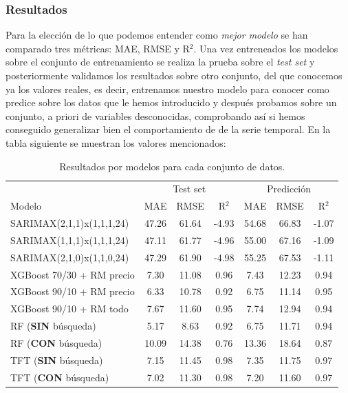 \subsubsection{Resultados}
%
%
%
Para la elección de lo que podemos entender como \textit{mejor modelo} se han comparado tres métricas: MAE, RMSE y R$^2$. Una vez entreneados los modelos sobre el conjunto de entrenamiento se realiza la prueba sobre el \textit{test set} y posteriormente validamos los resultados sobre otro conjunto, del que conocemos ya los valores reales, es decir, entrenamos nuestro modelo para conocer como predice sobre los datos que le hemos introducido y después probamos sobre un conjunto, a priori de variables desconocidas, comprobando así si hemos conseguido generalizar bien el comportamiento de de la serie temporal. En la tabla siguiente se muestran los valores mencionados:
\begin{table}[H]
    \centering
    \begin{tabular}{l|ccc|ccc}
        & \multicolumn{3}{c}{Test set} & \multicolumn{3}{c}{Predicción} \\
        Modelo & MAE & RMSE & R$^2$ & MAE & RMSE & R$^2$ \\
        \hline
        SARIMAX(2,1,1)x(1,1,1,24) & 47.26 & 61.64 & -4.93 & 54.68 & 66.83 & -1.07 \\
        SARIMAX(1,1,1)x(1,1,1,24) & 47.11 & 61.77 & -4.96 & 55.00 & 67.16 & -1.09 \\
        SARIMAX(2,1,0)x(1,1,0,24) & 47.29 & 61.90 & -4.98 & 55.25 & 67.53 & -1.11 \\
        XGBoost 70/30 + RM precio  & 7.30  & 11.08 & 0.96 & 7.43  & 12.23 & 0.94 \\
        XGBoost 90/10 + RM precio  & 6.33  & 10.78 & 0.92 & 6.75  & 11.14 & 0.95 \\
        XGBoost 90/10 + RM todo    & 7.67  & 11.60 & 0.95 & 7.74  & 12.94 & 0.94 \\
        RF (\textbf{SIN} búsqueda) & 5.17  & 8.63  & 0.92 & 6.75  & 11.71 & 0.94 \\
        RF (\textbf{CON} búsqueda) & 10.09 & 14.38 & 0.76 & 13.36 & 18.64 & 0.87 \\
        TFT (\textbf{SIN} búsqueda)& 7.15  & 11.45 & 0.98 & 7.35  & 11.75 & 0.97 \\
        TFT (\textbf{CON} búsqueda)& 7.02  & 11.30 & 0.98 & 7.20  & 11.60 & 0.97 \\
    \end{tabular}
    \caption{Resultados por modelos para cada conjunto de datos.}
    \label{tab:resultados_modelos}
\end{table}

